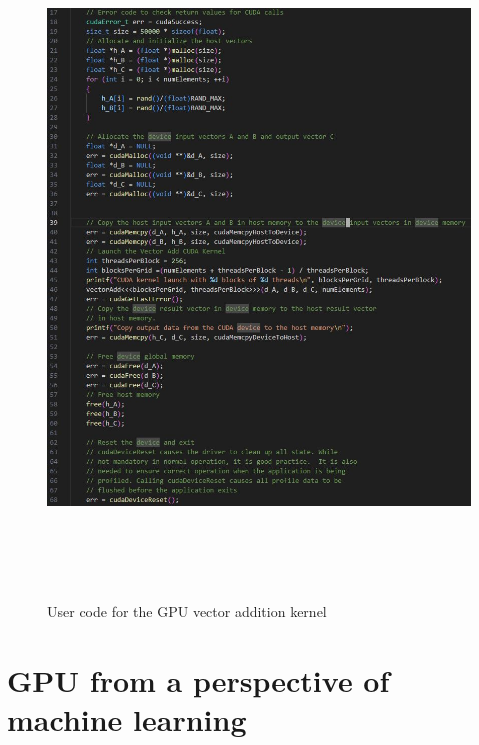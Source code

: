 \documentclass{article}
\begin{document}
\begin{figure}
    \centering
    \includegraphics[width=12cm,height=18cm]{main.JPG}
    \caption{User code for the GPU vector addition kernel}
    \label{fig:main}
\end{figure}


\section{GPU from a perspective of machine learning}
\end{document}
